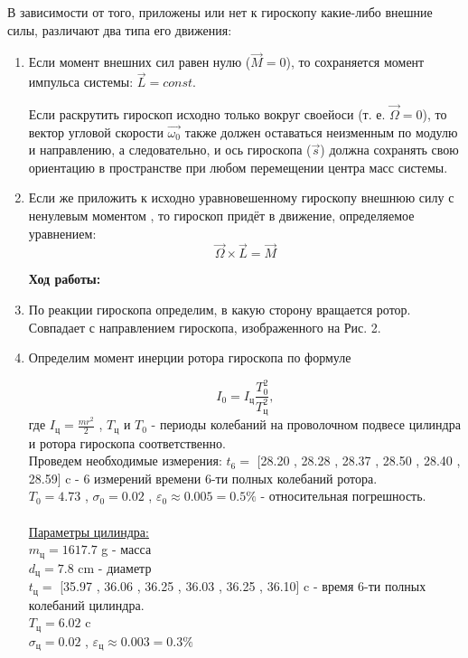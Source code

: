 \documentclass[8pt]{article}
\begin{document}
    В зависимости от того, приложены или нет к гироскопу какие-либо внешние силы, различают два типа его движения:
    \begin{enumerate}
        \item Если момент внешних сил равен нулю ($\vec{M} = 0$), то  сохраняется момент импульса системы: $\vec{L} = const$.
    
    Если раскрутить гироскоп исходно только вокруг своейоси (т. е. $\vec{\Omega} = 0$), то вектор угловой скорости $\vec{\omega_0}$ также должен оставаться неизменным по модулю и направлению, а следовательно, и ось гироскопа ($\vec{s}$) должна сохранять свою ориентацию в пространстве при любом перемещении центра масс системы.
    \item Если же приложить к исходно уравновешенному гироскопу внешнюю силу с ненулевым моментом , то гироскоп придёт в движение, определяемое уравнением:
    \begin{equation} \label{main}
        \vec{\Omega} \times \vec{L} = \vec{M}    
    \end{equation}

    \textbf{Ход работы:}
        \item По реакции гироскопа определим, в какую сторону вращается ротор. Совпадает с направлением гироскопа, изображенного на Рис. 2.

        \item Определим момент инерции ротора гироскопа по формуле
    
    $$I_0 = I_\text{ц} \frac{T_0^2}{T_\text{ц}^2},$$
    где $I_\text{ц} = \frac{mr^2}{2}$ , $T_\text{ц}$ и $T_0$ - периоды колебаний на проволочном подвесе цилиндра и ротора гироскопа соответственно. \\
    Проведем необходимые измерения:
    $t_6 = $ [28.20 , 28.28 , 28.37 , 28.50 , 28.40 , 28.59] c - 6 измерений времени 6-ти полных колебаний ротора. \\
    $T_{\text{0}} = 4.73$ , $\sigma_0 = 0.02$ , $\varepsilon_0 \approx 0.005 = 0.5\%$ - относительная погрешность. \\ \\
    \underline{Параметры цилиндра:} \\
    $m_{\text{ц}} = 1617.7$ g - масса\\
    $d_{\text{ц}} = 7.8$ cm - диаметр \\
    $t_{\text{ц}} = $ [35.97 , 36.06 , 36.25 , 36.03 , 36.25 , 36.10] c  - время 6-ти полных колебаний цилиндра.\\
    $T_{\text{ц}} = 6.02$ c \\ 
    $\sigma_{\text{ц}} = 0.02$ , 
    $\varepsilon_{\text{ц}} \approx 0.003 = 0.3 \%$


\end{enumerate}
\end{document}
